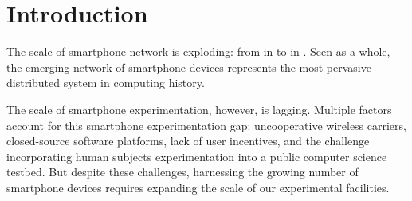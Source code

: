 \section{Introduction}
\label{sec-introduction}

The scale of smartphone network is exploding: from  in
 to  in .  Seen as a whole, the
emerging network of smartphone devices represents the most pervasive
distributed system in computing history.

The scale of smartphone experimentation, however, is lagging.  Multiple factors
account for this smartphone experimentation gap: uncooperative wireless
carriers, closed-source software platforms, lack of user incentives, and the
challenge incorporating human subjects experimentation into a public computer
science testbed. But despite these challenges, harnessing the growing number
of smartphone devices requires expanding the scale of our experimental
facilities.
